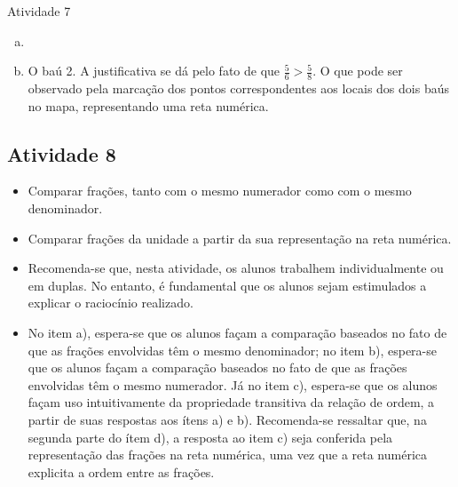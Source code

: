 \begin{multicols}{2}
\begin{resposta*}{Atividade 7}
 \begin{enumerate}[a)]
 \item  

  \item  O baú 2. A justificativa se dá pelo fato de que  $\frac{5}{6} > \frac{5}{8}$. O que pode ser observado pela marcação dos pontos correspondentes aos locais dos dois baús no mapa, representando uma reta numérica.
\end{enumerate}
\end{resposta*}


\subsection{Atividade 8}

\begin{itemize} %
    \item       Comparar frações, tanto com o mesmo numerador como com o mesmo denominador.
    \item       Comparar frações da unidade a partir da sua representação na reta numérica.
\end{itemize} %
  
      
\begin{itemize} %
    \item       Recomenda-se que, nesta atividade, os alunos trabalhem individualmente ou em duplas. No entanto, é fundamental que os alunos sejam estimulados a explicar o raciocínio realizado.
    \item       No item a), espera-se que os alunos façam a comparação baseados no fato de que as frações envolvidas têm o mesmo denominador; no item b), espera-se que os alunos façam a comparação baseados no fato de que as frações envolvidas têm o mesmo numerador. Já no item c), espera-se que os alunos façam uso intuitivamente da propriedade transitiva da relação de ordem, a partir de suas respostas aos ítens a) e b). Recomenda-se ressaltar que, na segunda parte do ítem d), a resposta ao item c) seja conferida pela representação das frações na reta numérica, uma vez que a reta numérica explicita a ordem entre as frações.  
\end{itemize} %


\end{multicols}
